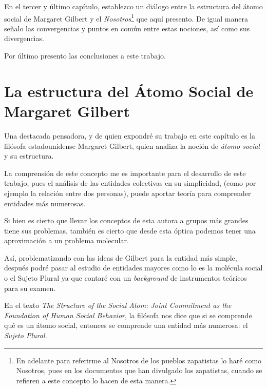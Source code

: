\documentclass[oneside]{book}
\begin{document}
En el tercer y último capítulo, establezco un diálogo entre la estructura del átomo social de Margaret Gilbert y el \textit{Nosotros}\footnote{En adelante para referirme al Nosotros de los pueblos zapatistas lo haré como Nosotros, pues en los documentos que han divulgado los zapatistas, cuando se refieren a este concepto lo hacen de esta manera.} que aquí presento. De igual manera señalo las convergencias y puntos en común entre estas nociones, así como sus divergencias.

Por último presento las conclusiones a este trabajo.

\chapter{La estructura del Átomo Social de Margaret Gilbert}

Una destacada pensadora, y de quien expondré su trabajo en este capítulo es la filósofa estadounidense Margaret Gilbert, quien analiza la noción de \textit{átomo social} y su estructura.

La comprensión de este concepto me es importante para el desarrollo de este trabajo, pues el análisis de las entidades colectivas en su simplicidad, (como por ejemplo la relación entre dos personas), puede aportar teoría para comprender entidades más numerosas. 

Si bien es cierto que llevar los conceptos de esta autora a grupos más grandes tiene sus problemas, también es cierto que desde esta óptica podemos tener una aproximación a un problema molecular.

Así, problematizando con las ideas de Gilbert para la entidad más simple, después podré pasar al estudio de entidades mayores como lo es la molécula social o el Sujeto Plural ya que contaré con un \textit{background} de instrumentos teóricos para su examen.

En el texto \textit{The Structure of the Social Atom: Joint Commitment as the Foundation of Human Social Behavior}\cite{gilbert_1}, la filósofa nos dice que si se comprende qué es un átomo social, entonces se comprende una entidad más numerosa: el \textit{Sujeto Plural.}
\end{document}
